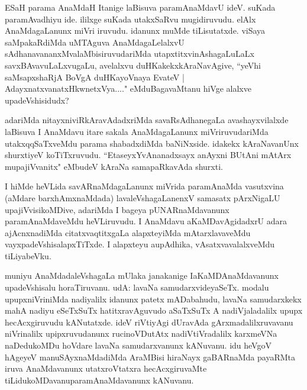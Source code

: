 \begin{artha}
ESaH parama AnaMdaH Itanige laBisuva paramAnaMdavU ideV. suKada paramAvadhiyu ide. ililxge suKada utakxSaRvu mugidiruvudu. elAlx AnaMdagaLanunx miVri iruvudu. idanunx muMde tiLisutatxde. viSaya saMpakaRdiMda uMTAguva AnaMdagaLelalxvU sAdhanavananxMvalaMbisiruvudariMda utapxtitxvinAshagaLuLaLx savxBAvavuLaLxvugaLu, avelalxvu duHKakekxkAraNavAgive, ``yeVhi saMsapxshaRjA BoVgA duHKayoVnaya EvateV | AdayxnatxvanatxHkwnetxVya...." eMdu\break BagavaMtanu hiVge alalxve upadeVshisidudx? 
\end{artha}

\begin{artha}
adariMda nitayxniviRkAravAdadxriMda savaRsAdhanegaLa avashayxvilalxde laBisuva I AnaMdavu itare sakala AnaMdagaLanunx miVriruvudariMda utakxqqSaTxveMdu parama shabadxdiMda baNiNxside. idakekx kAraNavanUnx shurxtiyeV koTiTxruvudu. ``EtaseyxYvAnanadxsayx anAyxni BUtAni mAtArx mupajiVvanitx" eMbudeV kAraNa samapaRkavAda shurxti.
\end{artha}


\begin{artha}
I hiMde heVLida savARnaMdagaLanunx miVrida paramAnaMda vasutxvina (aMdare barxhAmxnaMdada) lavaleVshagaLanenxV samasatx pArxNigaLU upajiVvisikoMDive, adariMda I bageya pUNARnaMdavanunx paramAnaMdaveMdu heVLiruvudu. I AnaMdavu aKaMDavAgidadxrU adara ajAcnxnadiMda citatxvaqtitxgaLa alapxteyiMda mAtarxlavaveMdu vayxpadeVshisalapxTiTxde. I alapxteyu aupAdhika, vAsatxvavalalxveMdu tiLiyabeVku.   
\end{artha}

\begin{artha}
muniyu AnaMdadaleVshagaLa mUlaka janakanige I\break aKaMDAnaMdavanunx upadeVshisalu horaTiruvanu. udA: lavaNa samudarxvideyaSeTx. modalu upupxniVriniMda nadiyalilx idanunx patetx mADabahudu, lavaNa samudarxkekx mahA nadiyu eSeTxSuTx hatitxravAguvudo aSaTxSuTx A nadiVjaladalilx upupx hecAcxgiruvudu kANutatxde. ideV riVtiyAgi dUravAda gArxmadalilxruvavanu niVrinalilx upipxruvudanunx rucinoVDutAtx nadiVtiVradalilx karxmeVNa naDedukoMDu hoVdare lavaNa samudarxvanunx kANuvanu. idu heVgoV hAgeyeV manuSAyxnaMdadiMda AraMBisi hiraNayx gaBARnaMda payaRMta iruva AnaMdavanunx utatxroVtatxra hecAcxgiruvaMte tiLidukoMDavanu\break paramAnaMdavanunx kANuvanu. 
\end{artha}


